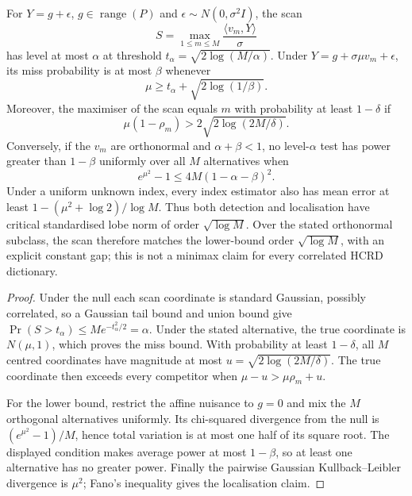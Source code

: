 \begin{theorem}
\label{thm:lobe-scan}
For $Y=g+\epsilon$, $g\in\operatorname{range}(P)$ and
$\epsilon\sim N(0,\sigma^2I)$, the scan
\begin{equation}
 S=\max_{1\le m\le M}\frac{\langle v_m,Y\rangle}{\sigma}
\end{equation}
has level at most $\alpha$ at threshold
$t_\alpha=\sqrt{2\log(M/\alpha)}$.  Under
$Y=g+\sigma\mu v_m+\epsilon$, its miss probability is at most $\beta$ whenever
\begin{equation}
 \mu\ge t_\alpha+\sqrt{2\log(1/\beta)}.
\end{equation}
Moreover, the maximiser of the scan equals $m$ with probability at least
$1-\delta$ if
\begin{equation}
 \mu(1-\rho_m)>2\sqrt{2\log(2M/\delta)}.
\end{equation}
Conversely, if the $v_m$ are orthonormal and $\alpha+\beta<1$, no level-$\alpha$
test has power greater than $1-\beta$ uniformly over all $M$ alternatives when
\begin{equation}
 e^{\mu^2}-1\le4M(1-\alpha-\beta)^2.
\end{equation}
Under a uniform unknown index, every index estimator also has mean error at
least $1-(\mu^2+\log2)/\log M$.  Thus both detection and localisation have
critical standardised lobe norm of order $\sqrt{\log M}$.  Over the stated
orthonormal subclass, the scan therefore matches the lower-bound order
$\sqrt{\log M}$, with an explicit constant gap; this is not a minimax claim
for every correlated HCRD dictionary.
\end{theorem}
\begin{proof}
Under the null each scan coordinate is standard Gaussian, possibly correlated,
so a Gaussian tail bound and union bound give
$\Pr(S>t_\alpha)\le M e^{-t_\alpha^2/2}=\alpha$.  Under the stated alternative,
the true coordinate is $N(\mu,1)$, which proves the miss bound.  With probability
at least $1-\delta$, all $M$ centred coordinates have magnitude at most
$u=\sqrt{2\log(2M/\delta)}$.  The true coordinate then exceeds every competitor
when $\mu-u>\mu\rho_m+u$.

For the lower bound, restrict the affine nuisance to $g=0$ and mix the $M$
orthogonal alternatives uniformly.  Its chi-squared divergence from the null is
$(e^{\mu^2}-1)/M$, hence total variation is at most one half of its square root.
The displayed condition makes average power at most $1-\beta$, so at least one
alternative has no greater power.  Finally the pairwise Gaussian
Kullback--Leibler divergence is $\mu^2$; Fano's inequality
\citep{cover2006elements} gives the localisation claim.
\end{proof}

